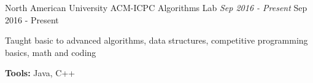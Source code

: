 \begin{cventries}
  \cventry
    {North American University}
    {ACM-ICPC Algorithms Lab \textnormal{\textit{Sep 2016 - Present}}}
    {}
    {Sep 2016 - Present}
    {
      \begin{cvitems}
        \item {Taught basic to advanced algorithms, data structures, competitive programming basics, math and coding}
        \item {\textbf{Tools:} Java, C++}
      \end{cvitems}
    }
  
\end{cventries}
